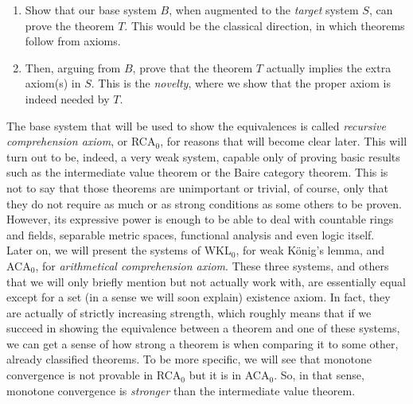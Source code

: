 \documentclass[../main.tex]{book}
\begin{document}
\begin{enumerate}
\item Show that our base system $B$, when augmented to the \textit{target} system $S$, can prove the theorem $T$. This would be the classical direction, in which theorems follow from axioms.
\item Then, arguing from $B$, prove that the theorem $T$ actually implies the extra axiom(s) in $S$. This is the \textit{novelty}, where we show that the proper axiom is indeed needed by $T$.
\end{enumerate}

The base system that will be used to show the equivalences is called \textit{recursive comprehension axiom}, or RCA$_0$, for reasons that will become clear later. This will turn out to be, indeed, a very weak system, capable only of proving basic results such as the intermediate value theorem or the Baire category theorem. This is not to say that those theorems are unimportant or trivial, of course, only that they do not require as much or as strong conditions as some others to be proven. However, its expressive power is enough to be able to deal with countable rings and fields, separable metric spaces, functional analysis and even logic itself. \\

Later on, we will present the systems of WKL$_0$, for weak König's lemma, and ACA$_0$, for \textit{arithmetical comprehension axiom}. These three systems, and others that we will only briefly mention but not actually work with, are essentially equal except for a set (in a sense we will soon explain) existence axiom. In fact, they are actually of strictly increasing strength, which roughly means that if we succeed in showing the equivalence between a theorem and one of these systems, we can get a sense of how strong a theorem is when comparing it to some other, already classified theorems. To be more specific, we will see that monotone convergence is not provable in RCA$_0$ but it is in ACA$_0$. So, in that sense, monotone convergence is \textit{stronger} than the intermediate value theorem.
\end{document}

